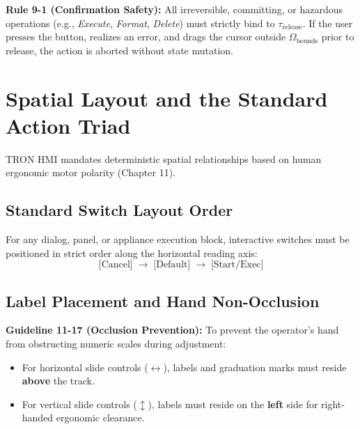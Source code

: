 \documentclass[10pt,journal,compsoc,twocolumn]{article}
\newcommand{\ja}[1]{\begin{CJK*}{UTF8}{min}#1\end{CJK*}}
\begin{document}
\textbf{Rule 9-1 (Confirmation Safety):} All irreversible, committing, or hazardous operations (e.g., \emph{Execute}, \emph{Format}, \emph{Delete}) must strictly bind to $\tau_{\text{release}}$. If the user presses the button, realizes an error, and drags the cursor outside $\Omega_{\text{bounds}}$ prior to release, the action is aborted without state mutation.

\section{Spatial Layout and the Standard Action Triad}
\label{sec:layout}

TRON HMI mandates deterministic spatial relationships based on human ergonomic motor polarity (Chapter 11).

\subsection{Standard Switch Layout Order}
For any dialog, panel, or appliance execution block, interactive switches must be positioned in strict order along the horizontal reading axis:
\begin{equation}
\text{[Cancel]} \;\longrightarrow\; \text{[Default]} \;\longrightarrow\; \text{[Start/Exec]}
\end{equation}

\subsection{Label Placement and Hand Non-Occlusion}
\textbf{Guideline 11-17 (Occlusion Prevention):} To prevent the operator's hand from obstructing numeric scales during adjustment:
\begin{itemize}[leftmargin=*]
    \item For horizontal slide controls ($\leftrightarrow$), labels and graduation marks must reside \textbf{above} the track.
    \item For vertical slide controls ($\updownarrow$), labels must reside on the \textbf{left} side for right-handed ergonomic clearance.
\end{itemize}
\end{document}

